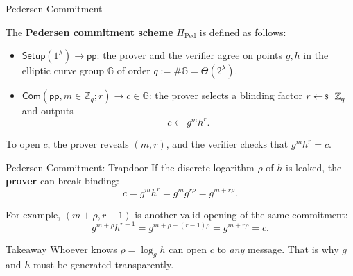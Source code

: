 \documentclass{zkdl-presentation-template}
\begin{document}
    \begin{frame}{Pedersen Commitment}
        \begin{definition}
            The \textbf{Pedersen commitment scheme} $\Pi_{\text{Ped}}$ is defined as follows:
            \begin{itemize}
                \item $\mathsf{Setup}(1^{\lambda}) \to \mathsf{pp}$: the prover and the verifier agree on points $g, h$ in the elliptic curve group $\mathbb{G}$ of order $q := \#\mathbb{G} = \Theta(2^{\lambda})$.\pause
                \item $\mathsf{Com}(\mathsf{pp}, m \in \mathbb{Z}_q; r) \to c \in \mathbb{G}$: the prover selects a blinding factor $r \leftarrowS \mathbb{Z}_q$ and outputs
                \begin{equation*}
                    c \gets g^m h^r.
                \end{equation*}
            \end{itemize}
        \end{definition}
        \pause

        To open $c$, the prover reveals $(m, r)$, and the verifier checks that $g^m h^r = c$.
    \end{frame}

    \begin{frame}{Pedersen Commitment: Trapdoor}
        If the discrete logarithm $\rho$ of $h$ is leaked, the \textbf{prover} can break binding:
        \begin{equation*}
            c = g^m h^r = g^m g^{r\rho} = g^{m + r\rho}.
        \end{equation*}
        \pause

        For example, $(m + \rho, r - 1)$ is another valid opening of the same commitment:
        \begin{equation*}
            g^{m+\rho} h^{r-1} = g^{m+\rho + (r-1)\rho} = g^{m + r\rho} = c.
        \end{equation*}
        \pause

        \begin{alertblock}{Takeaway}
            Whoever knows $\rho = \log_g h$ can open $c$ to \emph{any} message. That is why $g$ and $h$ must be generated transparently.
        \end{alertblock}
    \end{frame}
\end{document}

